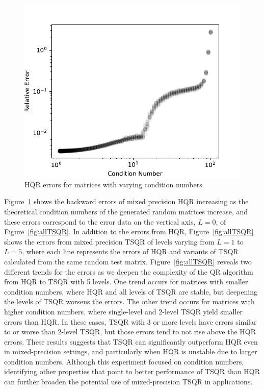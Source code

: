 \begin{figure}
	\centering
	\vspace{-10pt}
	\includegraphics[width=.4\textwidth]{./figures/unblocked.pdf}
	\caption{\label{fig:unblocked} HQR errors for matrices with varying condition numbers.}
\end{figure}
Figure~\ref{fig:unblocked} shows the backward errors of mixed precision HQR increasing as the theoretical condition numbers of the generated random matrices increase, and these errors correspond to the error data on the vertical axis, $L=0$, of Figure~\ref{fig:allTSQR}.
In addition to the errors from HQR, Figure~\ref{fig:allTSQR} shows the errors from mixed precision TSQR of levels varying from $L=1$ to $L=5$, where each line represents the errors of HQR and variants of TSQR calculated from the same random test matrix.
Figure~\ref{fig:allTSQR} reveals two different trends for the errors as we deepen the complexity of the QR algorithm from HQR to TSQR with 5 levels. 
One trend occurs for matrices with smaller condition numbers, where HQR and all levels of TSQR are stable, but deepening the levels of TSQR worsens the errors. 
The other trend occurs for matrices with higher condition numbers, where single-level and 2-level TSQR yield smaller errors than HQR. 
In these cases, TSQR with 3 or more levels have errors similar to or worse than 2-level TSQR, but those errors tend to not rise above the HQR errors.
These results suggests that TSQR can significantly outperform HQR even in mixed-precision settings, and particularly when HQR is unstable due to larger condition numbers.
Although this experiment focused on condition numbers, identifying other properties that point to better performance of TSQR than HQR can further broaden the potential use of mixed-precision TSQR in applications.
%

